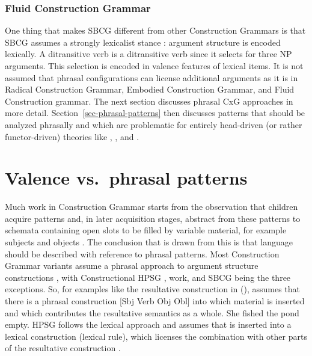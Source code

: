 \documentclass[output=paper
	        ,collection
	        ,collectionchapter
 	        ,biblatex
                ,babelshorthands
                ,newtxmath
                ,draftmode
                ,colorlinks, citecolor=brown
]{langscibook}
\begin{document}




\subsubsection{Fluid Construction Grammar}


One thing that makes SBCG different from other Construction Grammars is that SBCG assumes a strongly
lexicalist stance \citep{SW2011a}: argument structure is encoded lexically. A ditransitive verb is a
ditransitive verb since it selects for three NP arguments. This selection is encoded in valence
features of lexical items. It is not assumed that phrasal configurations can license additional
arguments as it is in Radical Construction Grammar, Embodied Construction Grammar, and Fluid
Construction grammar. The next section discusses phrasal CxG approaches in more
detail. Section~\ref{sec-phrasal-patterns} then discusses patterns that should be analyzed phrasally
and which are problematic for entirely head-driven (or rather functor-driven) theories like ,
, and .



\section{Valence vs.\ phrasal patterns}
\label{sec-valence}\label{sec-valence-vs-phrasal-patterns}

Much work in Construction Grammar starts from the observation that
children acquire patterns and, in later acquisition stages, abstract from these patterns to schemata
containing open slots to be filled by variable material, for example subjects and objects
\citep{Tomasello2003a}. The conclusion that is drawn from this is that language should be 
described with reference to phrasal patterns. Most Construction Grammar variants assume a phrasal
approach to argument structure constructions \citep{Goldberg95a,Goldberg2006a,GJ2004a}, with
Constructional HPSG \citep{Sag97a},  work, and SBCG \citep{SBK2012a,Sag2012a} being the
three exceptions. So, for examples like the resultative construction in (),
\citet{Goldberg95a} assumes that there is a phrasal construction [Sbj Verb Obj Obl] into which
material is inserted and which contributes the resultative semantics as a whole.
\ea
She fished the pond empty.
\z
HPSG follows the lexical approach and assumes that  is inserted into a lexical
construction (lexical rule), which licenses the combination with other parts of the resultative
construction \citep{Mueller2002b}.
\end{document}
